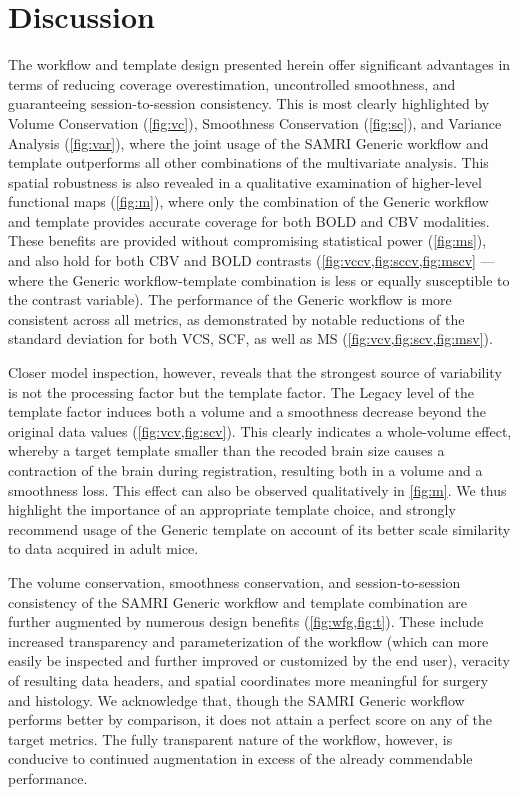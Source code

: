 \section{Discussion}

The workflow and template design presented herein offer significant advantages in terms of reducing coverage overestimation, uncontrolled smoothness, and guaranteeing session-to-session consistency.
This is most clearly highlighted by Volume Conservation (\cref{fig:vc}), Smoothness Conservation (\cref{fig:sc}), and Variance Analysis (\cref{fig:var}), where the joint usage of the SAMRI Generic workflow and template outperforms all other combinations of the multivariate analysis.
This spatial robustness is also revealed in a qualitative examination of higher-level functional maps (\cref{fig:m}), where only the combination of the Generic workflow and template provides accurate coverage for both BOLD and CBV modalities.
These benefits are provided without compromising statistical power (\cref{fig:ms}), and also hold for both CBV and BOLD contrasts (\cref{fig:vccv,fig:sccv,fig:mscv} --- where the Generic workflow-template combination is less or equally susceptible to the contrast variable).
The performance of the Generic workflow is more consistent across all metrics, as demonstrated by notable reductions of the standard deviation for both VCS, SCF, as well as MS (\cref{fig:vcv,fig:scv,fig:msv}).

Closer model inspection, however, reveals that the strongest source of variability is not the processing factor but the template factor.
The Legacy level of the template factor induces both a volume and a smoothness decrease beyond the original data values (\cref{fig:vcv,fig:scv}).
This clearly indicates a whole-volume effect, whereby a target template smaller than the recoded brain size causes a contraction of the brain during registration, resulting both in a volume and a smoothness loss.
This effect can also be observed qualitatively in \cref{fig:m}.
We thus highlight the importance of an appropriate template choice, and strongly recommend usage of the Generic template on account of its better scale similarity to data acquired in adult mice.

The volume conservation, smoothness conservation, and session-to-session consistency of the SAMRI Generic workflow and template combination are further augmented by numerous design benefits (\cref{fig:wfg,fig:t}).
These include increased transparency and parameterization of the workflow (which can more easily be inspected and further improved or customized by the end user), veracity of resulting data headers, and spatial coordinates more meaningful for surgery and histology.
We acknowledge that, though the SAMRI Generic workflow performs better by comparison, it does not attain a perfect score on any of the target metrics.
The fully transparent nature of the workflow, however, is conducive to continued augmentation in excess of the already commendable performance.

